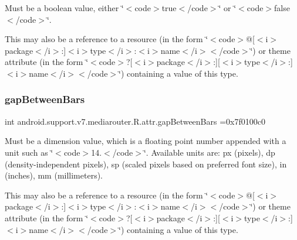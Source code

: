 Must be a boolean value, either \char`\"{}$<$code$>$true$<$/code$>$\char`\"{} or \char`\"{}$<$code$>$false$<$/code$>$\char`\"{}. 

This may also be a reference to a resource (in the form \char`\"{}$<$code$>$@\mbox{[}$<$i$>$package$<$/i$>$\+:\mbox{]}$<$i$>$type$<$/i$>$\+:$<$i$>$name$<$/i$>$$<$/code$>$\char`\"{}) or theme attribute (in the form \char`\"{}$<$code$>$?\mbox{[}$<$i$>$package$<$/i$>$\+:\mbox{]}\mbox{[}$<$i$>$type$<$/i$>$\+:\mbox{]}$<$i$>$name$<$/i$>$$<$/code$>$\char`\"{}) containing a value of this type. \mbox{\label{classandroid_1_1support_1_1v7_1_1mediarouter_1_1R_1_1attr_a21045eca06d08dbc355554d3ab7fc8ab}} 
\subsubsection{\texorpdfstring{gap\+Between\+Bars}{gapBetweenBars}}
{\footnotesize\ttfamily int android.\+support.\+v7.\+mediarouter.\+R.\+attr.\+gap\+Between\+Bars =0x7f0100c0\hspace{0.3cm}{\ttfamily [static]}}

Must be a dimension value, which is a floating point number appended with a unit such as \char`\"{}$<$code$>$14.\+5sp$<$/code$>$\char`\"{}. Available units are\+: px (pixels), dp (density-\/independent pixels), sp (scaled pixels based on preferred font size), in (inches), mm (millimeters). 

This may also be a reference to a resource (in the form \char`\"{}$<$code$>$@\mbox{[}$<$i$>$package$<$/i$>$\+:\mbox{]}$<$i$>$type$<$/i$>$\+:$<$i$>$name$<$/i$>$$<$/code$>$\char`\"{}) or theme attribute (in the form \char`\"{}$<$code$>$?\mbox{[}$<$i$>$package$<$/i$>$\+:\mbox{]}\mbox{[}$<$i$>$type$<$/i$>$\+:\mbox{]}$<$i$>$name$<$/i$>$$<$/code$>$\char`\"{}) containing a value of this type. \mbox{\label{classandroid_1_1support_1_1v7_1_1mediarouter_1_1R_1_1attr_a0f1539bfc582bd52fb633901a0844110}} 
